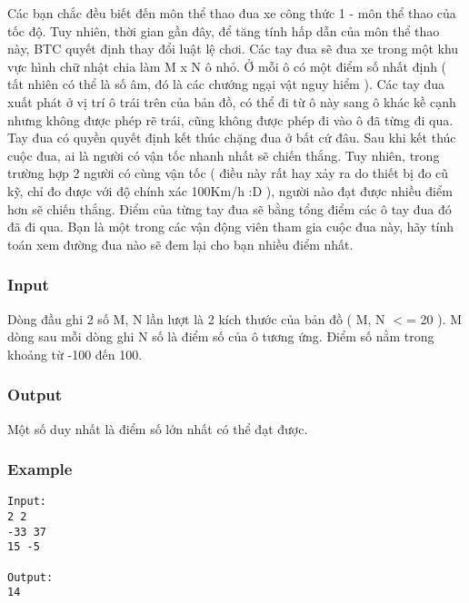 



   Các bạn chắc đều biết đến môn thể thao đua xe công thức 1 - môn thể thao của tốc độ. Tuy nhiên, thời gian gần đây, để tăng tính hấp dẫn của môn thể thao này, BTC quyết định thay đổi luật lệ chơi. Các tay đua sẽ đua xe trong một khu vực hình chữ nhật chia làm M x N ô nhỏ. Ở mỗi ô có một điểm số nhất định ( tất nhiên có thể là số âm, đó là các chướng ngại vật nguy hiểm ). Các tay đua xuất phát ở vị trí ô trái trên của bản đồ, có thể đi từ ô này sang ô khác kề cạnh nhưng không được phép rẽ trái, cũng không được phép đi vào ô đã từng đi qua. Tay đua có quyền quyết định kết thúc chặng đua ở bất cứ đâu. Sau khi kết thúc cuộc đua, ai là người có vận tốc nhanh nhất sẽ chiến thắng. Tuy nhiên, trong trường hợp 2 người có cùng vận tốc ( điều này rất hay xảy ra do thiết bị đo cũ kỹ, chỉ đo được với độ chính xác 100Km/h :D ), người nào đạt được nhiều điểm hơn sẽ chiến thắng. Điểm của từng tay đua sẽ bằng tổng điểm các ô tay đua đó đã đi qua. Bạn là một trong các vận động viên tham gia cuộc đua này, hãy tính toán xem đường đua nào sẽ đem lại cho bạn nhiều điểm nhất.  

\subsubsection{   Input  }

   Dòng đầu ghi 2 số M, N lần lượt là 2 kích thước của bản đồ ( M, N $<$= 20 ). M dòng sau mỗi dòng ghi N số là điểm số của ô tương ứng. Điểm số nằm trong khoảng từ -100 đến 100.  

\subsubsection{   Output  }

   Một số duy nhất là điểm số lớn nhất có thể đạt được.  

\subsubsection{   Example  }
\begin{verbatim}
Input:
2 2
-33 37
15 -5

Output:
14
\end{verbatim}